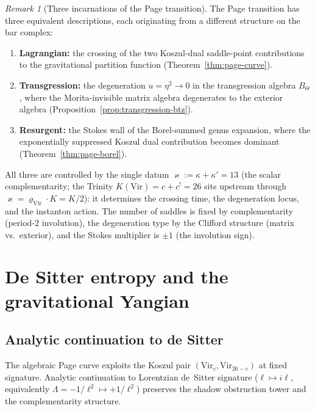 \documentclass[11pt,reqno]{amsart}
\theoremstyle{definition}
\theoremstyle{remark}
\newtheorem{remark}[theorem]{Remark}
\providecommand{\Vir}{\mathrm{Vir}}
\begin{document}
\begin{remark}[Three incarnations of the Page transition]
\label{rem:three-threads}
The Page transition has three equivalent descriptions, each
originating from a different structure on the bar complex:
\begin{enumerate}[label=\textup{(\arabic*)}]
\item \textbf{Lagrangian:} the crossing of the two Koszul-dual
  saddle-point contributions to the gravitational partition
  function (Theorem~\ref{thm:page-curve}).
\item \textbf{Transgression:} the degeneration
  $u = \eta^2 \to 0$ in the transgression algebra $B_\Theta$,
  where the Morita-invisible matrix algebra degenerates to the
  exterior algebra
  (Proposition~\ref{prop:transgression-btz}).
\item \textbf{Resurgent:} the Stokes wall of the Borel-summed
  genus expansion, where the exponentially suppressed Koszul dual
  contribution becomes dominant
  (Theorem~\ref{thm:page-borel}).
\end{enumerate}
All three are controlled by the single datum
$\varkappa := \kappa + \kappa' = 13$ (the scalar complementarity;
the Trinity $K(\Vir) = c + c^! = 26$ sits upstream through
$\varkappa = \varrho_{\Vir}\cdot K = K/2$): it
determines the crossing time, the degeneration locus, and the
instanton action. The number of saddles is fixed by
complementarity (period-$2$ involution), the degeneration type
by the Clifford structure (matrix vs.\ exterior), and the Stokes
multiplier is $\pm 1$ (the involution sign).
\end{remark}

\section{De Sitter entropy and the gravitational Yangian}
\label{sec:de-sitter}

\subsection{Analytic continuation to de Sitter}

The algebraic Page curve exploits the Koszul pair $(\mathrm{Vir}_c,
\mathrm{Vir}_{26-c})$ at fixed signature. Analytic continuation
to Lorentzian de~Sitter signature ($\ell \mapsto i\ell$, equivalently
$\Lambda = -1/\ell^2 \mapsto +1/\ell^2$) preserves the shadow
obstruction tower and the complementarity structure.
\end{document}
